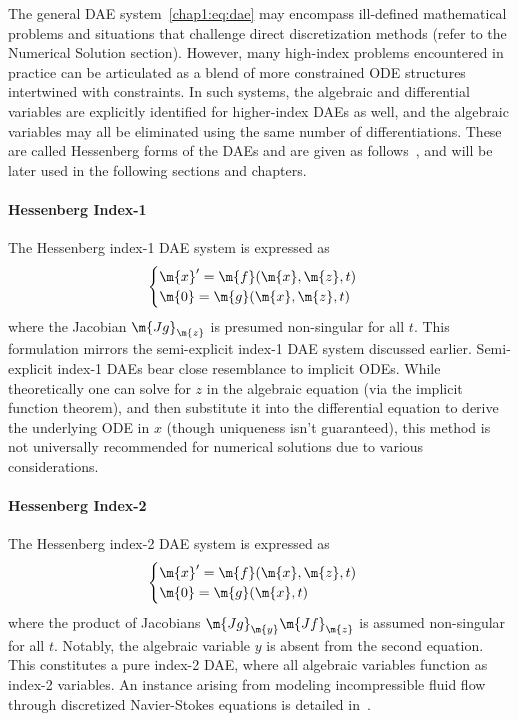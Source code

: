 The general \ac{DAE} system~\eqref{chap1:eq:dae} may encompass ill-defined mathematical problems and situations that challenge direct discretization methods (refer to the Numerical Solution section). However, many high-index problems encountered in practice can be articulated as a blend of more constrained \ac{ODE} structures intertwined with constraints. In such systems, the algebraic and differential variables are explicitly identified for higher-index DAEs as well, and the algebraic variables may all be eliminated using the same number of differentiations. These are called Hessenberg forms of the \acp{DAE} and are given as follows~\cite{brenan1995numerical}, and will be later used in the following sections and chapters.

\paragraph{Hessenberg Index-1}

The Hessenberg index-1 \ac{DAE} system is expressed as
%
\begin{equation*}
  \begin{cases}
    \m{x}^{\prime} = \m{f}(\m{x}, \m{z}, t) \\
    \m{0} = \m{g}(\m{x}, \m{z}, t)
  \end{cases}
\end{equation*}
%
where the Jacobian $\m{Jg}_\m{z}$ is presumed non-singular for all $t$. This formulation mirrors the semi-explicit index-1 \ac{DAE} system discussed earlier. Semi-explicit index-1 \acp{DAE} bear close resemblance to implicit \acp{ODE}. While theoretically one can solve for $z$ in the algebraic equation (via the implicit function theorem), and then substitute it into the differential equation to derive the underlying \ac{ODE} in $x$ (though uniqueness isn't guaranteed), this method is not universally recommended for numerical solutions due to various considerations.

\paragraph{Hessenberg Index-2}

The Hessenberg index-2 \ac{DAE} system is expressed as
%
\begin{equation*}
  \begin{cases}
    \m{x}^{\prime} = \m{f}(\m{x}, \m{z}, t) \\
    \m{0} = \m{g}(\m{x}, t)
  \end{cases}
\end{equation*}
%
where the product of Jacobians $\m{Jg}_\m{y}\m{Jf}_\m{z}$ is assumed non-singular for all $t$. Notably, the algebraic variable $y$ is absent from the second equation. This constitutes a pure index-2 \ac{DAE}, where all algebraic variables function as index-2 variables. An instance arising from modeling incompressible fluid flow through discretized Navier-Stokes equations is detailed in~\cite{ascher1998computer}.

